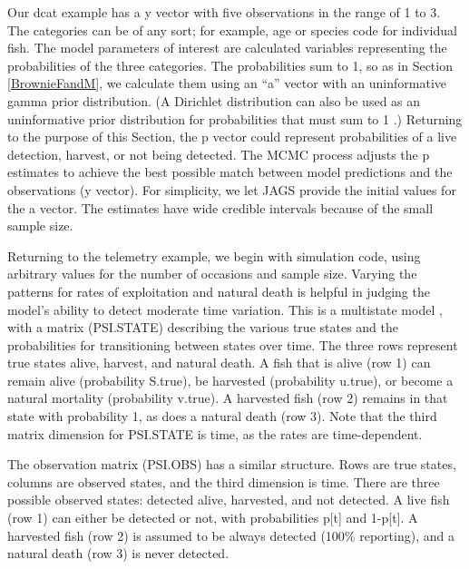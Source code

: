 \documentclass[
]{krantz}
\begin{document}
Our dcat example has a y vector with five observations in the range of 1 to 3. The categories can be of any sort; for example, age or species code for individual fish. The model parameters of interest are calculated variables representing the probabilities of the three categories. The probabilities sum to 1, so as in Section \ref{BrownieFandM}, we calculate them using an ``a'' vector with an uninformative gamma prior distribution. (A Dirichlet distribution can also be used as an uninformative prior distribution for probabilities that must sum to 1 \citep{mccarthy2007}.) Returning to the purpose of this Section, the p vector could represent probabilities of a live detection, harvest, or not being detected. The MCMC process adjusts the p estimates to achieve the best possible match between model predictions and the observations (y vector). For simplicity, we let JAGS provide the initial values for the a vector. The estimates have wide credible intervals because of the small sample size.

Returning to the telemetry example, we begin with simulation code, using arbitrary values for the number of occasions and sample size. Varying the patterns for rates of exploitation and natural death is helpful in judging the model's ability to detect moderate time variation. This is a multistate model \citep{kéry.schaub_2011}, with a matrix (PSI.STATE) describing the various true states and the probabilities for transitioning between states over time. The three rows represent true states alive, harvest, and natural death. A fish that is alive (row 1) can remain alive (probability S.true), be harvested (probability u.true), or become a natural mortality (probability v.true). A harvested fish (row 2) remains in that state with probability 1, as does a natural death (row 3). Note that the third matrix dimension for PSI.STATE is time, as the rates are time-dependent.

The observation matrix (PSI.OBS) has a similar structure. Rows are true states, columns are observed states, and the third dimension is time. There are three possible observed states: detected alive, harvested, and not detected. A live fish (row 1) can either be detected or not, with probabilities p{[}t{]} and 1-p{[}t{]}. A harvested fish (row 2) is assumed to be always detected (100\% reporting), and a natural death (row 3) is never detected.
\end{document}
